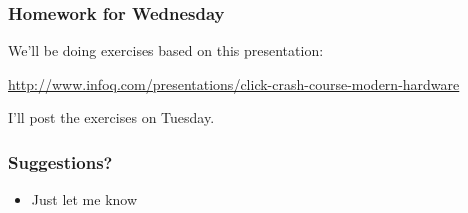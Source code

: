 \begin{frame}
  \frametitle{Homework for Wednesday}

  \begin{changemargin}{2cm}
    We'll be doing exercises based on this presentation:
  \end{changemargin}
  \begin{center}
    \url{http://www.infoq.com/presentations/click-crash-course-modern-hardware}
  \end{center}
  \begin{changemargin}{2cm}
    I'll post the exercises on Tuesday.
  \end{changemargin}
\end{frame}


\begin{frame}
  \frametitle{Suggestions?}

  \begin{itemize}
    \item Just let me know
  \end{itemize}
\end{frame}


